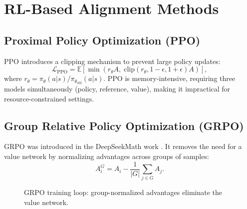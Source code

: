 \documentclass[12pt]{report}
\begin{document}
\section{RL-Based Alignment Methods}

\subsection{Proximal Policy Optimization (PPO)}

PPO \citep{schulman2017proximal} introduces a clipping mechanism to prevent large policy updates:
\begin{equation}
\mathcal{L}_{\text{PPO}} = \mathbb{E}\left[\min\left( r_{\theta}A, \; \text{clip}(r_{\theta}, 1-\epsilon, 1+\epsilon)A \right)\right],
\end{equation}
where $r_{\theta} = \pi_{\theta}(a|s) / \pi_{\theta_{\text{old}}}(a|s)$. PPO is memory-intensive, requiring three models simultaneously (policy, reference, value), making it impractical for resource-constrained settings.

\subsection{Group Relative Policy Optimization (GRPO)}

GRPO was introduced in the DeepSeekMath work \citep{deepseekmath2024}. It removes the need for a value network by normalizing advantages across groups of samples:
\begin{equation}
A_{i}^{G} = A_{i} - \frac{1}{|G|}\sum_{j \in G} A_{j}.
\end{equation}

\begin{figure}[H]
\centering
{}
\caption{GRPO training loop: group-normalized advantages eliminate the value network.}
\label{fig:grpo_loop}
\end{figure}
\end{document}
